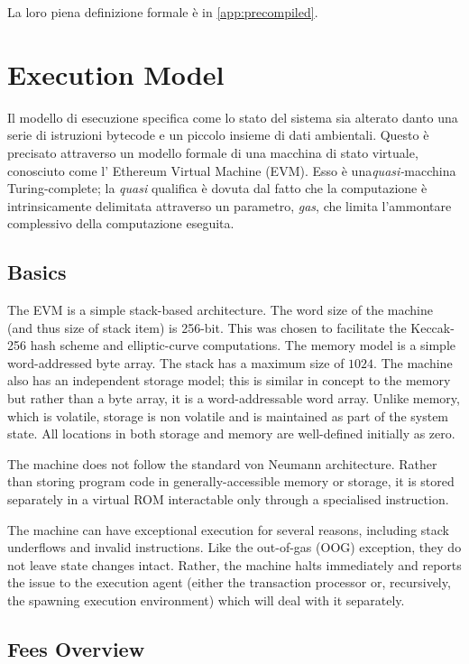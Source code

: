 \documentclass[9pt,oneside]{amsart}
\begin{document}
\begin{multicols}{2}
La loro piena definizione formale è in \ref{app:precompiled}.

\section{Execution Model} \label{ch:model}

Il modello di esecuzione specifica come lo stato del sistema sia alterato danto una serie di istruzioni bytecode e un piccolo insieme di dati ambientali. Questo è precisato attraverso un modello formale di una macchina di stato virtuale, conosciuto come l' Ethereum Virtual Machine (EVM). Esso è una\textit{quasi-}macchina Turing-complete; la \textit{quasi} qualifica è dovuta dal fatto che la computazione è intrinsicamente delimitata attraverso un parametro, \textit{gas}, che limita l'ammontare complessivo della computazione eseguita.

\subsection{Basics}

The EVM is a simple stack-based architecture. The word size of the machine (and thus size of stack item) is 256-bit. This was chosen to facilitate the Keccak-256 hash scheme and elliptic-curve computations. The memory model is a simple word-addressed byte array. The stack has a maximum size of $1024$. The machine also has an independent storage model; this is similar in concept to the memory but rather than a byte array, it is a word-addressable word array. Unlike memory, which is volatile, storage is non volatile and is maintained as part of the system state. All locations in both storage and memory are well-defined initially as zero.

The machine does not follow the standard von Neumann architecture. Rather than storing program code in generally-accessible memory or storage, it is stored separately in a virtual ROM interactable only through a specialised instruction.

The machine can have exceptional execution for several reasons, including stack underflows and invalid instructions. Like the out-of-gas (OOG) exception, they do not leave state changes intact. Rather, the machine halts immediately and reports the issue to the execution agent (either the transaction processor or, recursively, the spawning execution environment) which will deal with it separately.

\subsection{Fees Overview}


\end{multicols}
\end{document}
